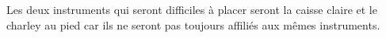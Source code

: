Les deux instruments qui seront difficiles à placer seront la caisse claire et le charley au pied car ils ne seront pas toujours affiliés aux mêmes instruments.